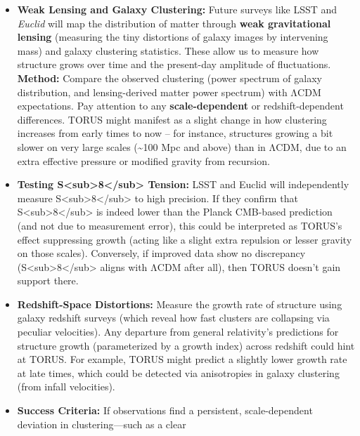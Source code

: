 \documentclass[
]{article}
\begin{document}
\begin{itemize}
  \begin{itemize}
  \item
    \textbf{Weak Lensing and Galaxy Clustering:} Future surveys like
    LSST and \emph{Euclid} will map the distribution of matter through
    \textbf{weak gravitational lensing} (measuring the tiny distortions
    of galaxy images by intervening mass) and galaxy clustering
    statistics. These allow us to measure how structure grows over time
    and the present-day amplitude of fluctuations. \textbf{Method:}
    Compare the observed clustering (power spectrum of galaxy
    distribution, and lensing-derived matter power spectrum) with ΛCDM
    expectations. Pay attention to any \textbf{scale-dependent} or
    redshift-dependent differences. TORUS might manifest as a slight
    change in how clustering increases from early times to now -- for
    instance, structures growing a bit slower on very large scales
    (\textasciitilde100 Mpc and above) than in ΛCDM, due to an extra
    effective pressure or modified gravity from recursion.
  \item
    \textbf{Testing
    S\textless sub\textgreater8\textless/sub\textgreater{} Tension:}
    LSST and Euclid will independently measure
    S\textless sub\textgreater8\textless/sub\textgreater{} to high
    precision. If they confirm that
    S\textless sub\textgreater8\textless/sub\textgreater{} is indeed
    lower than the Planck CMB-based prediction (and not due to
    measurement error), this could be interpreted as TORUS's effect
    suppressing growth (acting like a slight extra repulsion or lesser
    gravity on those scales)\hspace{0pt}. Conversely, if improved data
    show no discrepancy
    (S\textless sub\textgreater8\textless/sub\textgreater{} aligns with
    ΛCDM after all), then TORUS doesn't gain support there.
  \item
    \textbf{Redshift-Space Distortions:} Measure the growth rate of
    structure using galaxy redshift surveys (which reveal how fast
    clusters are collapsing via peculiar velocities). Any departure from
    general relativity's predictions for structure growth (parameterized
    by a growth index) across redshift could hint at TORUS. For example,
    TORUS might predict a slightly lower growth rate at late times,
    which could be detected via anisotropies in galaxy clustering (from
    infall velocities).
  \item
    \textbf{Success Criteria:} If observations find a persistent,
    scale-dependent deviation in clustering---such as a clear

\end{itemize}
\end{itemize}
\end{document}
